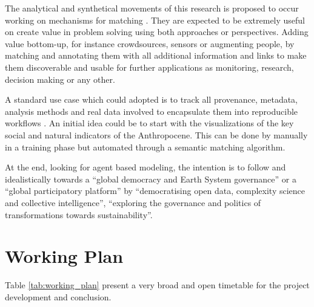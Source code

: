 \documentclass[
	12pt, %
	a4paper, %
	oneside, %
	headinclude, footinclude, %
	BCOR5mm, %
]{scrartcl}
\begin{document}
The analytical and synthetical movements of this research is proposed to occur working on mechanisms for matching \citep{zheng_sem+:_2015}. They are expected to be extremely useful on create value in problem solving using both approaches or perspectives. Adding value bottom-up, for instance crowdsources, sensors or augmenting people, by matching and annotating them with all additional information and links to make them discoverable and usable for further applications as monitoring, research, decision making or any other.

A standard use case which could adopted is to track all provenance, metadata, analysis methods and real data involved \cite{ma_capturing_2014} to encapsulate them into reproducible workflows \citep{mattoso_addressing_2016}. An initial idea could be to start with the visualizations of the key social and natural indicators of the Anthropocene. This can be done by manually in a training phase but automated through a semantic matching algorithm.

At the end, looking for agent based modeling, the intention is to follow \cite{pitt_interleaving_2011,pitt_axiomatization_2012} and \cite{jones_design_2013} idealistically towards a ``global democracy and Earth System governance'' \citep{dryzek_global_2011}
or a ``global participatory platform'' \citep{buckingham_shum_towards_2012} by ``democratising open data, complexity science and collective intelligence'', ``exploring the governance and politics of transformations towards sustainability''\citep{patterson_exploring_2016}.


\section{Working Plan}

Table \ref{tab:working_plan} present a very broad and open timetable for the project development and conclusion.
\end{document}
